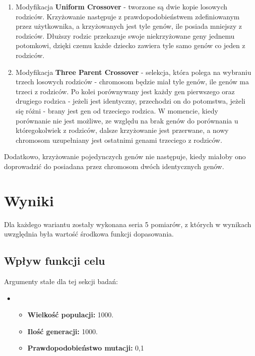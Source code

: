 \documentclass{classrep}
\begin{document}
\begin{enumerate}
    \item Modyfikacja \textbf{Uniform Crossover} - tworzone są dwie kopie losowych rodziców. Krzyżowanie następuje z prawdopodobieństwem zdefiniowanym przez użytkownika, a krzyżowanych jest tyle genów, ile posiada mniejszy z rodziców. Dłuższy rodzic przekazuje swoje niekrzyżowane geny jednemu potomkowi, dzięki czemu każde dziecko zawiera tyle samo genów co jeden z rodziców.
    \item Modyfikacja \textbf{Three Parent Crossover} - selekcja, która polega na wybraniu trzech losowych rodziców - chromosom będzie miał tyle genów, ile genów ma trzeci z rodziców. Po kolei porównywany jest każdy gen pierwszego oraz drugiego rodzica - jeżeli jest identyczny, przechodzi on do potomstwa, jeżeli się różni - brany jest gen od trzeciego rodzica. W momencie, kiedy porównanie nie jest możliwe, ze względu na brak genów do porównania u któregokolwiek z rodziców, dalsze krzyżowanie jest przerwane, a nowy chromosom uzupełniany jest ostatnimi genami trzeciego z rodziców.
\end{enumerate}

Dodatkowo, krzyżowanie pojedynczych genów nie następuje, kiedy miałoby ono doprowadzić do posiadana przez chromosom dwóch identycznych genów. 


\section{Wyniki}
Dla każdego wariantu zostały wykonana seria 5 pomiarów, z których w wynikach uwzględnia była wartość środkowa funkcji dopasowania.

\subsection{Wpływ funkcji celu}

Argumenty stałe dla tej sekcji badań:
\begin{itemize}
    \item[]
    \begin{itemize}
        \item \textbf{Wielkość populacji:} 1000.
        \item \textbf{Ilość generacji:} 1000.
        \item \textbf{Prawdopodobieństwo mutacji:} 0,1
    \end{itemize}
\end{itemize}
\end{document}

